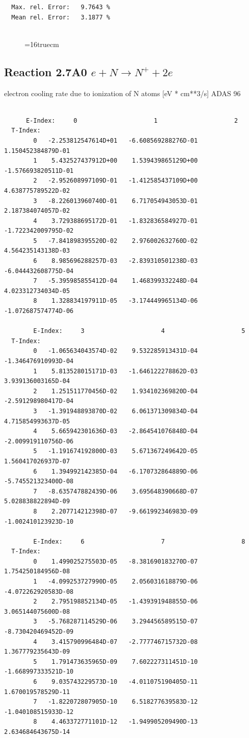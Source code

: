 \documentclass[12pt,dvips]{article}
\begin{document}
\begin{small}
\begin{verbatim}
  Max. rel. Error:   9.7643 %
  Mean rel. Error:   3.1877 %


\end{verbatim}\end{small}
\begin{figure} \label{2.6il}
\epsfxsize=16truecm
\end{figure}
\newpage

\subsection{
  Reaction 2.7A0  $e + N  \rightarrow N^+   + 2e $
}
electron cooling rate due to ionization of N atoms [eV * cm**3/s]
ADAS 96

\begin{small}\begin{verbatim}

      E-Index:     0                     1                     2
  T-Index:
        0   -2.253812547614D+01   -6.608569288276D-01    1.150452384879D-01
        1    5.432527437912D+00    1.539439865129D+00   -1.576693820511D-01
        2   -2.952608997109D-01   -1.412585437109D+00    4.638775789522D-02
        3   -8.226013960740D-01    6.717054943053D-01    2.187384074057D-02
        4    3.729388695172D-01   -1.832836584927D-01   -1.722342009795D-02
        5   -7.841898395520D-02    2.976002632760D-02    4.564235143138D-03
        6    8.985696288257D-03   -2.839310501238D-03   -6.044432608775D-04
        7   -5.395985855412D-04    1.468399332248D-04    4.023312734034D-05
        8    1.328834197911D-05   -3.174449965134D-06   -1.072687574774D-06

        E-Index:     3                     4                     5
  T-Index:
        0   -1.065634043574D-02    9.532285913431D-04   -1.346476910993D-04
        1    5.813528015171D-03   -1.646122278862D-03    3.939136003165D-04
        2    1.251511770456D-02    1.934102369820D-04   -2.591298980417D-04
        3   -1.391948893870D-02    6.061371309834D-04    4.715854993637D-05
        4    5.665942301636D-03   -2.864541076848D-04   -2.009919110756D-06
        5   -1.191674192800D-03    5.671367249642D-05    1.560417026937D-07
        6    1.394992142385D-04   -6.170732864889D-06   -5.745521323400D-08
        7   -8.635747882439D-06    3.695648390668D-07    5.028838822894D-09
        8    2.207714212398D-07   -9.661992346983D-09   -1.002410123923D-10

        E-Index:     6                     7                     8
  T-Index:
        0    1.499025275503D-05   -8.381690183270D-07    1.754250184956D-08
        1   -4.099253727990D-05    2.056031618879D-06   -4.072262920583D-08
        2    2.795198852134D-05   -1.439391948855D-06    3.065144075600D-08
        3   -5.768287114529D-06    3.294456589515D-07   -8.730420469452D-09
        4    3.415790996484D-07   -2.777746715732D-08    1.367779235643D-09
        5    1.791473635965D-09    7.602227311451D-10   -1.668997333521D-10
        6    9.035743229573D-10   -4.011075190405D-11    1.670019578529D-11
        7   -1.822072807905D-10    6.518277639583D-12   -1.040108515933D-12
        8    4.463372771101D-12   -1.949905209490D-13    2.634684643675D-14


\end{verbatim}
\end{small}
\end{document}

